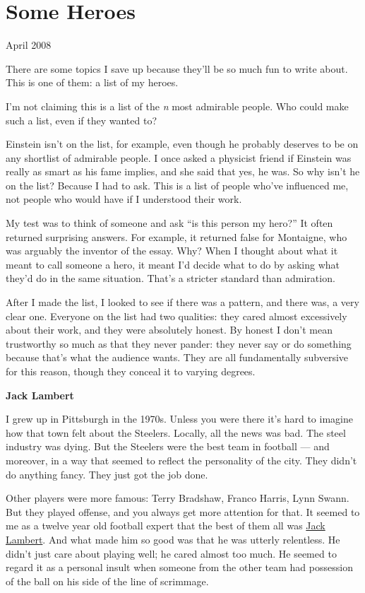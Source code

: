 \chapter{Some Heroes}

April 2008

There are some topics I save up because they'll be so much fun to write
about. This is one of them: a list of my heroes.

I'm not claiming this is a list of the \emph{n} most admirable people.
Who could make such a list, even if they wanted to?

Einstein isn't on the list, for example, even though he probably
deserves to be on any shortlist of admirable people. I once asked a
physicist friend if Einstein was really as smart as his fame implies,
and she said that yes, he was. So why isn't he on the list? Because I
had to ask. This is a list of people who've influenced me, not people
who would have if I understood their work.

My test was to think of someone and ask ``is this person my hero?'' It
often returned surprising answers. For example, it returned false for
Montaigne, who was arguably the inventor of the essay. Why? When I
thought about what it meant to call someone a hero, it meant I'd decide
what to do by asking what they'd do in the same situation. That's a
stricter standard than admiration.

After I made the list, I looked to see if there was a pattern, and there
was, a very clear one. Everyone on the list had two qualities: they
cared almost excessively about their work, and they were absolutely
honest. By honest I don't mean trustworthy so much as that they never
pander: they never say or do something because that's what the audience
wants. They are all fundamentally subversive for this reason, though
they conceal it to varying degrees.

\textbf{Jack Lambert}

I grew up in Pittsburgh in the 1970s. Unless you were there it's hard to
imagine how that town felt about the Steelers. Locally, all the news was
bad. The steel industry was dying. But the Steelers were the best team
in football --- and moreover, in a way that seemed to reflect the
personality of the city. They didn't do anything fancy. They just got
the job done.

Other players were more famous: Terry Bradshaw, Franco Harris, Lynn
Swann. But they played offense, and you always get more attention for
that. It seemed to me as a twelve year old football expert that the best
of them all was
\href{http://en.wikipedia.org/wiki/Jack_Lambert_(American_football_player)}{Jack
Lambert}. And what made him so good was that he was utterly relentless.
He didn't just care about playing well; he cared almost too much. He
seemed to regard it as a personal insult when someone from the other
team had possession of the ball on his side of the line of scrimmage.

